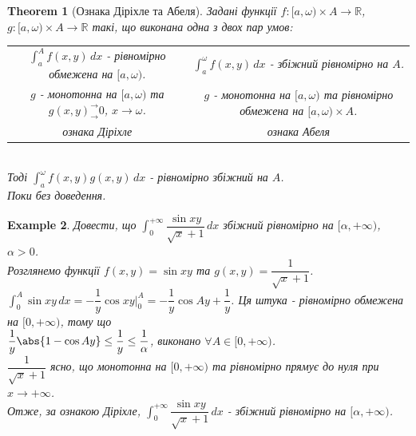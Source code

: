 \documentclass[a4paper, 10pt]{article}
\def\huge{\displaystyle}
\def\bigline{\vspace{5mm}\\}
\theoremstyle{theoremdd}
\newtheorem{theorem}{Theorem}[subsection]
\theoremstyle{theoremdd}
\theoremstyle{theoremdd}
\theoremstyle{theoremdd}
\theoremstyle{theoremdd}
\newtheorem{example}[theorem]{Example}
\theoremstyle{theoremdd}
\theoremstyle{theoremdd}
\theoremstyle{theoremdd}
\theoremstyle{theoremdd}
\begin{document}
\begin{theorem}[Ознака Діріхле та Абеля]
Задані функції $f: [a,\omega) \times A \to \mathbb{R}$, $g: [a,\omega) \times A \to \mathbb{R}$ такі, що виконана одна з двох пар умов:

\begin{tabular}{c | c}
$\huge\int_a^A f(x,y)\,dx$ - рівномірно обмежена на $[a,\omega)$. & $\huge\int_a^\omega f(x,y)\,dx$ - збіжний рівномірно на $A$. \\
$g$ - монотонна на $[a,\omega)$ та $g(x,y)^\rightarrow_\rightarrow 0$, $x \to \omega$. & $g$ - монотонна на $[a,\omega)$ та рівномірно обмежена на $[a,\omega) \times A$.\\
\textit{ознака Діріхле} & \textit{ознака Абеля}
\end{tabular} \\
Тоді $\huge \int_a^\omega f(x,y) g(x,y)\,dx$ - рівномірно збіжний на $A$.\\
\textit{Поки без доведення.}
\end{theorem}

\begin{example}
Довести, що $\huge\int_0^{+\infty} \dfrac{\sin xy}{\sqrt{x}+1}\,dx$ збіжний рівномірно на $[\alpha,+\infty)$, $\alpha>0$.\\
Розглянемо функції $f(x,y) = \sin xy$ та $g(x,y) = \dfrac{1}{\sqrt{x}+1}$.\\
$\huge\int_0^A \sin xy\,dx = -\dfrac{1}{y} \cos xy \Big|_{0}^A = -\dfrac{1}{y} \cos Ay + \dfrac{1}{y}$. Ця штука - рівномірно обмежена на $[0,+\infty)$, тому що\\
$\dfrac{1}{y} \abs{1 - \cos Ay} \leq \dfrac{1}{y} \leq \dfrac{1}{\alpha}$, виконано $\forall A \in [0,+\infty)$.\\
$\dfrac{1}{\sqrt{x}+1}$ ясно, що монотонна на $[0,+\infty)$ та рівномірно прямує до нуля при $x \to +\infty$.\\
Отже, за ознакою Діріхле, $\huge\int_0^{+\infty} \dfrac{\sin xy}{\sqrt{x}+1}\,dx$ - збіжний рівномірно на $[\alpha,+\infty)$.
\end{example}
\end{document}

